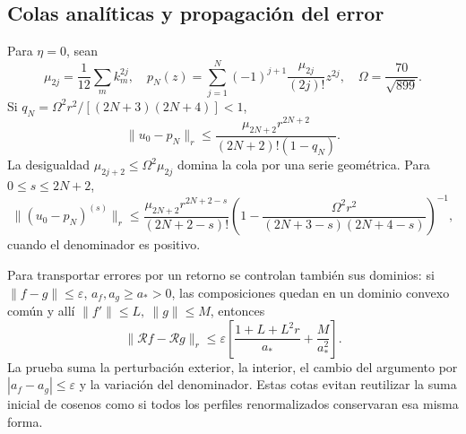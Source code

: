 \subsection{Colas analíticas y propagación del error}
\label{hmtfg:desarrollo:9}

Para \(\eta=0\), sean
\[
\mu_{2j}=\frac1{12}\sum_mk_m^{2j},\quad
p_N(z)=\sum_{j=1}^N(-1)^{j+1}\frac{\mu_{2j}}{(2j)!}z^{2j},
\quad\Omega=\frac{70}{\sqrt{899}}.
\]
Si \(q_N=\Omega^2r^2/[(2N+3)(2N+4)]<1\),
\[
\|u_0-p_N\|_r\le
\frac{\mu_{2N+2}r^{2N+2}}{(2N+2)!(1-q_N)}.
\]
La desigualdad \(\mu_{2j+2}\le\Omega^2\mu_{2j}\) domina la cola por una serie geométrica. Para \(0\le s\le2N+2\),
\[
\|(u_0-p_N)^{(s)}\|_r\le
\frac{\mu_{2N+2}r^{2N+2-s}}{(2N+2-s)!}
\left(1-\frac{\Omega^2r^2}{(2N+3-s)(2N+4-s)}\right)^{-1},
\]
cuando el denominador es positivo.

Para transportar errores por un retorno se controlan también sus dominios: si \(\|f-g\|\le\varepsilon\), \(a_f,a_g\ge a_*>0\), las composiciones quedan en un dominio convexo común y allí \(\|f'\|\le L,\ \|g\|\le M\), entonces
\[
\|\mathcal Rf-\mathcal Rg\|_r
\le\varepsilon\left[\frac{1+L+L^2r}{a_*}+\frac{M}{a_*^2}\right].
\]
La prueba suma la perturbación exterior, la interior, el cambio del argumento por \(|a_f-a_g|\le\varepsilon\) y la variación del denominador. Estas cotas evitan reutilizar la suma inicial de cosenos como si todos los perfiles renormalizados conservaran esa misma forma.
